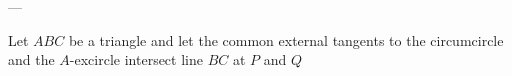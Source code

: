 
---

Let $ABC$ be a triangle and let the common external tangents to the
circumcircle and the $A$-excircle intersect line $BC$ at $P$ and $Q$
